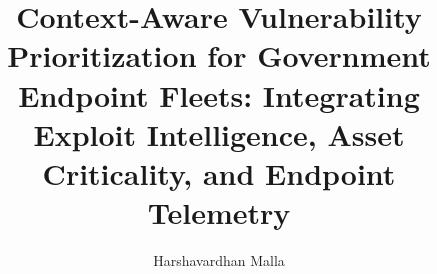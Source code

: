 \documentclass[manuscript,review,anonymous=false]{acmart}
\begin{document}
\title{Context-Aware Vulnerability Prioritization for Government Endpoint Fleets:
Integrating Exploit Intelligence, Asset Criticality, and Endpoint Telemetry}

\author{Harshavardhan Malla}
\email{}                              %

\begin{abstract}

\end{abstract}


\maketitle




















\begin{table}[t]\centering\small
  \caption{Acceptance and integrity checks for the frozen 30-seed run.}
  \label{tab:acceptance}
\end{table}
\end{document}
